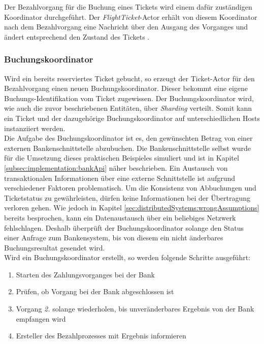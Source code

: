 % 
% 
Der Bezahlvorgang für die Buchung eines Tickets wird einem dafür zuständigen Koordinator durchgeführt. Der \textit{FlightTicket}-Actor erhält von diesem Koordinator nach dem Bezahlvorgang eine Nachricht über den Ausgang des Vorganges und ändert entsprechend den Zustand des Tickets .

\subsubsection{Buchungskoordinator}
\label{subsub:implementation:ChargingCoordinator}
Wird ein bereits reserviertes Ticket gebucht, so erzeugt der Ticket-Actor für den Bezahlvorgang einen neuen Buchungskoordinator. Dieser bekommt eine eigene Buchungs-Identifikation vom Ticket zugewissen. Der Buchungskoordinator wird, wie auch die zuvor beschriebenen Entitäten, über \textit{Sharding} verteilt. Somit kann ein Ticket und der dazugehörige Buchungskoordinator auf unterschiedlichen Hosts instanziiert werden. \\
Die Aufgabe des Buchungskoordinator ist es, den gewünschten Betrag von einer externen Bankenschnittstelle abzubuchen. Die Bankenschnittstelle selbst wurde für die Umsetzung dieses praktischen Beispieles simuliert und ist in Kapitel \ref{subsec:implementation:bankApi} näher beschrieben. Ein Austausch von transaktionalen Informationen über eine externe Schnittstelle ist aufgrund verschiedener Faktoren problematisch. Um die Konsistenz von Abbuchungen und Ticketstatus zu gewährleisten, dürfen keine Informationen bei der Übertragung verloren gehen. Wie jedoch in Kapitel \ref{sec:distributedSystems:wrongAssumptions} bereits besprochen, kann ein Datenaustausch über ein beliebiges Netzwerk fehlschlagen. Deshalb überprüft der Buchungskoordinator solange den Status einer Anfrage zum Bankensystem, bis von diesem ein nicht änderbares Buchungsresultat gesendet wird. \\
Wird ein Buchungskoordinator erstellt, so werden folgende Schritte ausgeführt:
\begin{enumerate}
    \item Starten des Zahlungsvorganges bei der Bank
    \item Prüfen, ob Vorgang bei der Bank abgeschlossen ist
    \item Vorgang \textit{2.} solange wiederholen, bis unveränderbares Ergebnis von der Bank empfangen wird
    \item Ersteller des Bezahlprozesses mit Ergebnis informieren
\end{enumerate}
